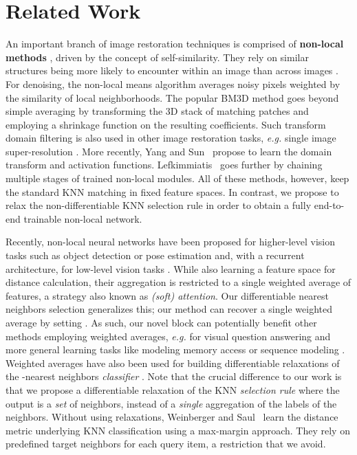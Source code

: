 \documentclass{article}
\makeatletter
\newcommand{\eg}{\emph{e.\thinspace{}g.}\@\xspace}
\makeatother
\begin{document}
\section{Related Work}
An important branch of image restoration techniques is comprised of \textbf{non-local methods} \cite{Buades:2005:NLA,Dabov:2006:IDB,Lotan:2016:NMR,Zontak:2013:SSN}, driven by the concept of self-similarity.
They rely on similar structures being more likely to encounter within an image than across images \cite{Zontak:2011:ISS}.
For denoising, the non-local means algorithm \cite{Buades:2005:NLA} averages noisy pixels weighted by the similarity of
local neighborhoods.
The popular BM3D method \cite{Dabov:2006:IDB} goes beyond simple averaging by transforming the 3D stack of matching patches and employing a shrinkage function on the resulting coefficients. 
Such transform domain filtering is also used in other image restoration tasks, \eg single image super-resolution \cite{Cruz:2018:SIS}.
More recently, Yang and Sun~\cite{Yang:2018:BM3D} propose to learn the domain transform and activation functions.
Lefkimmiatis~\cite{Lefkimmiatis:2017:NLC,Lefkimmiatis:2018:UDN} goes further by chaining multiple stages of trained non-local modules.
All of these methods, however, keep the standard KNN matching in fixed feature spaces. 
In contrast, we propose to relax the non-differentiable KNN selection rule in order to obtain a fully end-to-end trainable non-local network.



Recently, non-local neural networks have been proposed for higher-level vision tasks such as object detection or pose estimation \cite{Wang:2017:NLN} and, with a recurrent architecture, for low-level vision tasks \cite{Liu:2018:NLR}. 
While also learning a feature space for distance calculation, their aggregation is restricted to a single weighted average of features, a strategy also known as \emph{(soft) attention}. 
Our differentiable nearest neighbors selection generalizes this; our method can recover a single weighted average by setting .
As such, our novel  block can potentially benefit other methods employing weighted averages, \eg for visual question answering \cite{Xu:2016:AA}
and more general learning tasks like 
modeling memory access \cite{Graves:2014:NTM} or sequence modeling \cite{Vaswani:2017:AIA}.
Weighted averages have also been used for building differentiable relaxations
of the -nearest neighbors \emph{classifier} \cite{Goldberger:2005:NCA,Ren:2014:LCN,Vinyals:2016:MNF}. 
Note that the crucial difference to our work is that we propose a differentiable relaxation of the KNN \emph{selection rule} where the output is a \emph{set} of neighbors, instead of a \emph{single} aggregation of the labels of the neighbors.
Without using relaxations, Weinberger and Saul~\cite{Weinberger:2009:DML} learn the distance metric underlying KNN classification using a max-margin approach.
They rely on predefined target neighbors for each query item, a restriction that we avoid. 
\end{document}
